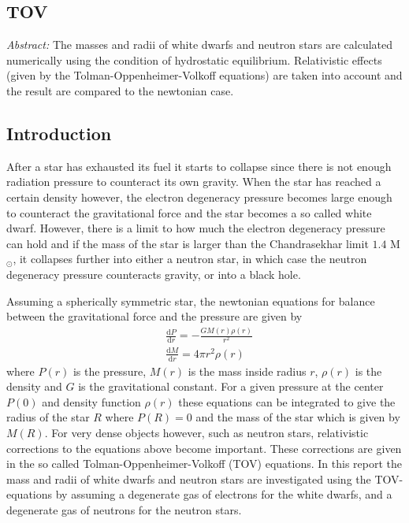 \documentclass[twocolumn]{article}
\begin{document}
\begin{large}

\section*{TOV}
\begin{normalsize}
\textit{Abstract:} The masses and radii of white dwarfs and neutron stars are calculated numerically using the condition of hydrostatic equilibrium. Relativistic effects (given by the Tolman-Oppenheimer-Volkoff equations) are taken into account and the result are compared to the newtonian case. 
\end{normalsize}
\subsection*{Introduction}

After a star has exhausted its fuel it starts to collapse since there is not enough radiation pressure to counteract its own gravity. When the star has reached a certain density however, the electron degeneracy pressure becomes large enough to counteract the gravitational force and the star becomes a so called white dwarf. However, there is a limit to how much the electron degeneracy pressure can hold and if the mass of the star is larger than the Chandrasekhar limit $1.4$ M$_\odot$, it collapses further into either a neutron star, in which case the neutron degeneracy pressure counteracts gravity, or into a black hole. 

Assuming a spherically symmetric star, the newtonian equations for balance between the gravitational force and the pressure are given by
\begin{equation}
    \label{28maj1900}
    \begin{split}
        &\frac{\text{d}P}{\text{d}r} = -\frac{GM(r)\rho(r)}{r^2} \\ 
        &\frac{\text{d}M}{\text{d}r} = 4\pi r^2\rho(r)
    \end{split}
\end{equation}
where $P(r)$ is the pressure, $M(r)$ is the mass inside radius $r$, $\rho(r)$ is the density and $G$ is the gravitational constant. For a given pressure at the center $P(0)$ and density function $\rho(r)$ these equations can be integrated to give the radius of the star $R$ where $P(R)=0$ and the mass of the star which is given by $M(R)$. For very dense objects however, such as neutron stars, relativistic corrections to the equations above become important. These corrections are given in the so called Tolman-Oppenheimer-Volkoff (TOV) equations. In this report the mass and radii of white dwarfs and neutron stars are investigated using the TOV-equations by assuming a degenerate gas of electrons for the white dwarfs, and a degenerate gas of neutrons for the neutron stars.


\end{large}
\end{document}
